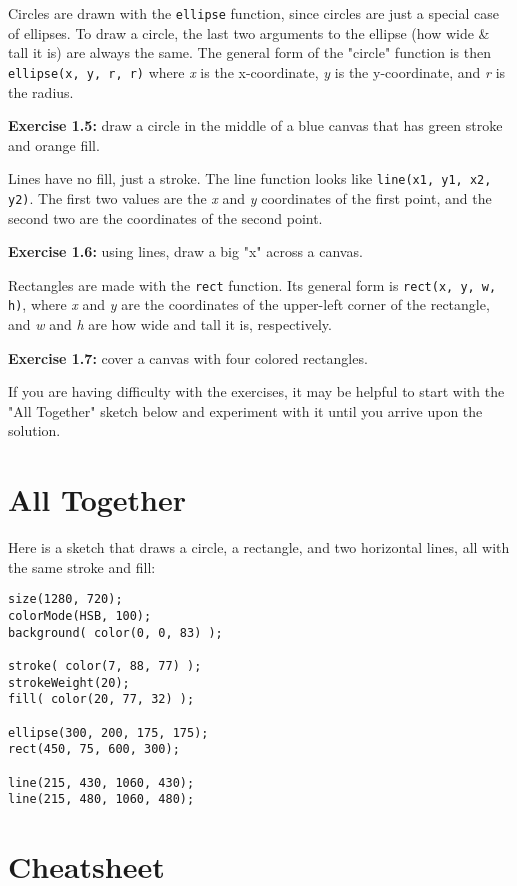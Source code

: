 \documentclass[
]{leaflet}
\begin{document}
Circles are drawn with the \texttt{ellipse} function, since circles are just a special case of ellipses.
To draw a circle, the last two arguments to the ellipse (how wide \& tall it is) are always the same.
The general form of the "circle" function is then \texttt{ellipse(x, y, r, r)} where \textit{x} is the x-coordinate, \textit{y} is the y-coordinate, and \textit{r} is the radius.

\textbf{Exercise 1.5:} draw a circle in the middle of a blue canvas that has green stroke and orange fill.

Lines have no fill, just a stroke.
The line function looks like \texttt{line(x1, y1, x2, y2)}.
The first two values are the \textit{x} and \textit{y} coordinates of the first point, and the second two are the coordinates of the second point.

\textbf{Exercise 1.6:} using lines, draw a big "x" across a canvas.

Rectangles are made with the \texttt{rect} function.
Its general form is \texttt{rect(x, y, w, h)}, where \textit{x} and \textit{y} are the coordinates of the upper-left corner of the rectangle, and \textit{w} and \textit{h} are how wide and tall it is, respectively.

\textbf{Exercise 1.7:} cover a canvas with four colored rectangles.

If you are having difficulty with the exercises, it may be helpful to start with the "All Together" sketch below and experiment with it until you arrive upon the solution.

\section{All Together}

Here is a sketch that draws a circle, a rectangle, and two horizontal lines, all with the same stroke and fill:

\begin{lstlisting}
size(1280, 720);
colorMode(HSB, 100);
background( color(0, 0, 83) );

stroke( color(7, 88, 77) );
strokeWeight(20);
fill( color(20, 77, 32) );

ellipse(300, 200, 175, 175);
rect(450, 75, 600, 300);

line(215, 430, 1060, 430);
line(215, 480, 1060, 480);
\end{lstlisting}


\section{Cheatsheet}
\end{document}
